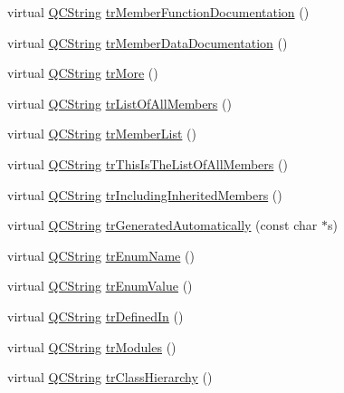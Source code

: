 \begin{DoxyCompactItemize}
virtual \mbox{\hyperlink{class_q_c_string}{Q\+C\+String}} \mbox{\hyperlink{class_translator_japanese_a8290eb235b1ac9997bbf1bc086ef9f45}{tr\+Member\+Function\+Documentation}} ()
\item 
virtual \mbox{\hyperlink{class_q_c_string}{Q\+C\+String}} \mbox{\hyperlink{class_translator_japanese_aaafcf0473aaba6a49c204f9ca9d9f4f5}{tr\+Member\+Data\+Documentation}} ()
\item 
virtual \mbox{\hyperlink{class_q_c_string}{Q\+C\+String}} \mbox{\hyperlink{class_translator_japanese_ace0d0d1b6449e2ca250714c3893b856a}{tr\+More}} ()
\item 
virtual \mbox{\hyperlink{class_q_c_string}{Q\+C\+String}} \mbox{\hyperlink{class_translator_japanese_a98a6bb8e80def1a098f1a1e40bd00c0c}{tr\+List\+Of\+All\+Members}} ()
\item 
virtual \mbox{\hyperlink{class_q_c_string}{Q\+C\+String}} \mbox{\hyperlink{class_translator_japanese_ac30ef2352b160302e767af80901c19be}{tr\+Member\+List}} ()
\item 
virtual \mbox{\hyperlink{class_q_c_string}{Q\+C\+String}} \mbox{\hyperlink{class_translator_japanese_a45dd215136b1a871f08e1a238223622f}{tr\+This\+Is\+The\+List\+Of\+All\+Members}} ()
\item 
virtual \mbox{\hyperlink{class_q_c_string}{Q\+C\+String}} \mbox{\hyperlink{class_translator_japanese_a610b6aa5096254ab88ce10ca55e24640}{tr\+Including\+Inherited\+Members}} ()
\item 
virtual \mbox{\hyperlink{class_q_c_string}{Q\+C\+String}} \mbox{\hyperlink{class_translator_japanese_a45c56599d692308b483171ad4e5e6585}{tr\+Generated\+Automatically}} (const char $\ast$s)
\item 
virtual \mbox{\hyperlink{class_q_c_string}{Q\+C\+String}} \mbox{\hyperlink{class_translator_japanese_a7e33d5dda7b42867114222d1c2c86b0b}{tr\+Enum\+Name}} ()
\item 
virtual \mbox{\hyperlink{class_q_c_string}{Q\+C\+String}} \mbox{\hyperlink{class_translator_japanese_a22c91fb4d65a211817217acc600afbd5}{tr\+Enum\+Value}} ()
\item 
virtual \mbox{\hyperlink{class_q_c_string}{Q\+C\+String}} \mbox{\hyperlink{class_translator_japanese_ac6b129846bb438195e46847a70e7695c}{tr\+Defined\+In}} ()
\item 
virtual \mbox{\hyperlink{class_q_c_string}{Q\+C\+String}} \mbox{\hyperlink{class_translator_japanese_a1fb3baf66fdddeaaa291d12fe8cb080b}{tr\+Modules}} ()
\item 
virtual \mbox{\hyperlink{class_q_c_string}{Q\+C\+String}} \mbox{\hyperlink{class_translator_japanese_ac7607e00fecebe825dcf39bffd221b77}{tr\+Class\+Hierarchy}} ()

\end{DoxyCompactItemize}
